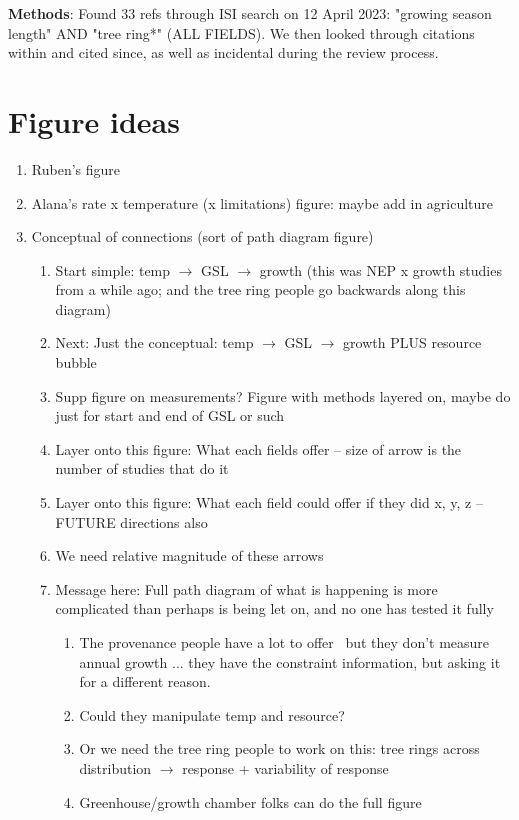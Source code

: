 \documentclass[11pt,letter]{article}
\begin{document}
{\bf Methods}: Found 33 refs through ISI search on 12 April 2023: "growing season length" AND "tree ring*" (ALL FIELDS). We then looked through citations within and cited since, as well as incidental during the review process.\\


\section{Figure ideas}

\begin{enumerate}
\item Ruben's figure
\item Alana's rate x temperature (x limitations) figure: maybe add in agriculture
\item Conceptual of connections (sort of path diagram figure)
\begin{enumerate}
\item Start simple: temp $\rightarrow$ GSL $\rightarrow$ growth (this was NEP x growth studies from a while ago; and the tree ring people go backwards along this diagram)
\item Next: Just the conceptual: temp $\rightarrow$ GSL $\rightarrow$ growth PLUS resource bubble
\item Supp figure on measurements? Figure with methods layered on, maybe do just for start and end of GSL or such
\item Layer onto this figure: What each fields offer -- size of arrow is the number of studies that do it
\item Layer onto this figure: What each field could offer if they did x, y, z -- FUTURE directions also
\item We need relative magnitude of these arrows
\item Message here: Full path diagram of what is happening is more complicated than perhaps is being let on, and no one has tested it fully
\begin{enumerate}
\item The provenance people have a lot to offer
\ but they don't measure annual growth ... they have the constraint information, but asking it for a different reason. 
\item Could they manipulate temp and resource?
\item Or we need the tree ring people to work on this: tree rings across distribution  $\rightarrow$ response + variability of response
\item Greenhouse/growth chamber folks can do the full figure

\end{enumerate}
\end{enumerate}
\end{enumerate}
\end{document}
